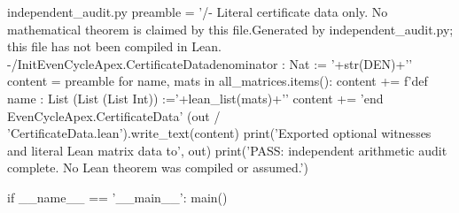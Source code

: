 \begin{filecontents*}[overwrite]{independent_audit.py}
        preamble = '/- Literal certificate data only. No mathematical theorem is claimed by this file.\n   Generated by independent_audit.py; this file has not been compiled in Lean. -/\nimport Init\n\nnamespace EvenCycleApex.CertificateData\n\ndef denominator : Nat := '+str(DEN)+'\n\n'
        content = preamble
        for name, mats in all_matrices.items():
            content += f'def {name} : List (List (List Int)) :=\n  '+lean_list(mats)+'\n\n'
        content += 'end EvenCycleApex.CertificateData\n'
        (out / 'CertificateData.lean').write_text(content)
        print('Exported optional witnesses and literal Lean matrix data to', out)
    print('PASS: independent arithmetic audit complete. No Lean theorem was compiled or assumed.')


if __name__ == '__main__':
    main()
\end{filecontents*}


\documentclass[11pt,a4paper]{article}
\usepackage{amsmath,amssymb,amsthm,mathtools,mathrsfs,booktabs,array,longtable}
\newtheorem{theorem}{Theorem}[section]
\newtheorem{lemma}[theorem]{Lemma}
\newtheorem{proposition}[theorem]{Proposition}
\newtheorem{corollary}[theorem]{Corollary}
\theoremstyle{definition}
\newtheorem{definition}[theorem]{Definition}
\theoremstyle{remark}
\newtheorem{remark}[theorem]{Remark}
\newcommand{\E}{\mathbb E}
\newcommand{\R}{\mathbb R}
\newcommand{\Q}{\mathbb Q}
\newcommand{\N}{\mathbb N}
\newcommand{\Z}{\mathbb Z}
\newcommand{\Tr}{\operatorname{Tr}}
\newcommand{\diag}{\operatorname{diag}}
\newcommand{\supp}{\operatorname{supp}}
\newcommand{\Hom}{\operatorname{Hom}}
\newcommand{\id}{\operatorname{id}}
\newcommand{\TV}{T_U}
\newcommand{\PP}{\mathcal P}
\newcommand{\JJ}{\mathcal J}
\newcommand{\FF}{\mathscr F}
\newcommand{\DD}{\mathcal D}
\newcommand{\QQ}[1]{Q_{#1}^{\sharp}}
\newcommand{\one}{\mathbf 1}
\newcommand{\abs}[1]{\left|#1\right|}
\newcommand{\norm}[1]{\left\|#1\right\|}
\newcommand{\inner}[2]{\left\langle #1,#2\right\rangle}
\newcommand{\proved}{\textbf{Proved.}\ }
\newcommand{\code}[1]{\texttt{\detokenize{#1}}}
\newcommand{\Fin}{\operatorname{Fin}}
\newcommand{\Perm}{\operatorname{Perm}}
\newcommand{\eval}{\operatorname{ev}}
\newcommand{\Mask}{\mathcal M}
\newcommand{\normform}{\nu}
\newcommand{\denom}{\mathscr D}
\newcommand{\sourceuniversal}{the universal note}

